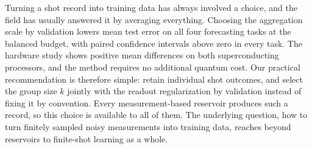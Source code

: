 Turning a shot record into training data has always involved a choice, and the
field has usually answered it by averaging everything. Choosing the aggregation
scale by validation lowers mean test error on all four forecasting tasks at the
balanced budget, with paired confidence intervals above zero in every task.
The hardware study shows positive mean differences on both superconducting
processors, and the method requires no additional quantum cost. Our practical
recommendation is therefore simple: retain individual shot outcomes, and select
the group size $k$ jointly with the readout regularization by validation instead
of fixing it by convention. Every measurement-based reservoir produces such a
record, so this choice is available to all of them. The underlying question, how
to turn finitely sampled noisy measurements into training data, reaches beyond
reservoirs to finite-shot learning as a whole.
